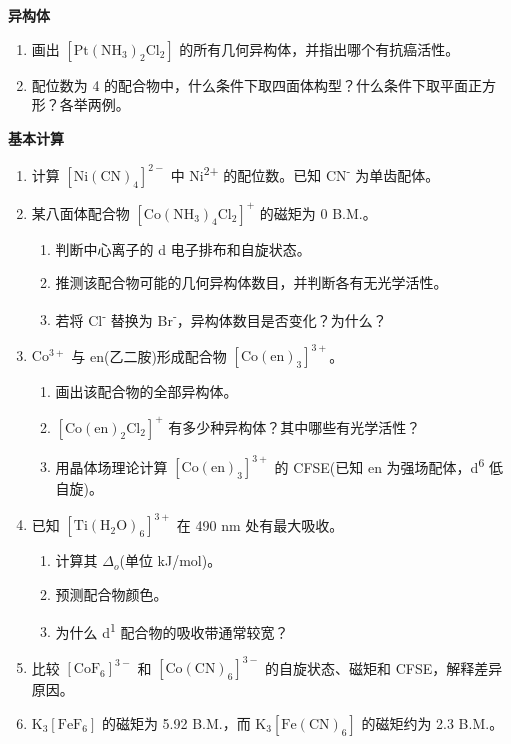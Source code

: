 \textbf{异构体}

\begin{enumerate}
\def\labelenumi{\arabic{enumi}.}
\setcounter{enumi}{9}
\item
  画出 \([\mathrm{Pt(NH_3)_2Cl_2}]\) 的所有几何异构体，并指出哪个有抗癌活性。
\item
  配位数为 4 的配合物中，什么条件下取四面体构型？什么条件下取平面正方形？各举两例。
\end{enumerate}

\textbf{基本计算}

\begin{enumerate}
\def\labelenumi{\arabic{enumi}.}
\setcounter{enumi}{11}
\item
  计算 \([\mathrm{Ni(CN)_4}]^{2-}\) 中 Ni\textsuperscript{2+} 的配位数。已知 CN\textsuperscript{-} 为单齿配体。
\item
  某八面体配合物 \(\mathrm{[Co(NH_3)_4Cl_2]^+}\) 的磁矩为 0 B.M.。

  \begin{enumerate}
  \def\labelenumii{(\alph{enumii})}
  \tightlist
  \item
    判断中心离子的 d 电子排布和自旋状态。
  \item
    推测该配合物可能的几何异构体数目，并判断各有无光学活性。
  \item
    若将 Cl\textsuperscript{-} 替换为 Br\textsuperscript{-}，异构体数目是否变化？为什么？
  \end{enumerate}
\item
  \(\mathrm{Co^{3+}}\) 与 en(乙二胺)形成配合物 \(\mathrm{[Co(en)_3]^{3+}}\)。

  \begin{enumerate}
  \def\labelenumii{(\alph{enumii})}
  \tightlist
  \item
    画出该配合物的全部异构体。
  \item
    \(\mathrm{[Co(en)_2Cl_2]^+}\) 有多少种异构体？其中哪些有光学活性？
  \item
    用晶体场理论计算 \(\mathrm{[Co(en)_3]^{3+}}\) 的 CFSE(已知 en 为强场配体，d\textsuperscript{6} 低自旋)。
  \end{enumerate}
\item
  已知 \(\mathrm{[Ti(H_2O)_6]^{3+}}\) 在 490 nm 处有最大吸收。

  \begin{enumerate}
  \def\labelenumii{(\alph{enumii})}
  \tightlist
  \item
    计算其 \(\Delta_o\)(单位 kJ/mol)。
  \item
    预测配合物颜色。
  \item
    为什么 d\textsuperscript{1} 配合物的吸收带通常较宽？
  \end{enumerate}
\item
  比较 \([\mathrm{CoF_6}]^{3-}\) 和 \([\mathrm{Co(CN)_6}]^{3-}\) 的自旋状态、磁矩和 CFSE，解释差异原因。
\item
  \(\mathrm{K_3[FeF_6]}\) 的磁矩为 5.92 B.M.，而 \(\mathrm{K_3[Fe(CN)_6]}\) 的磁矩约为 2.3 B.M.。


\end{enumerate}
